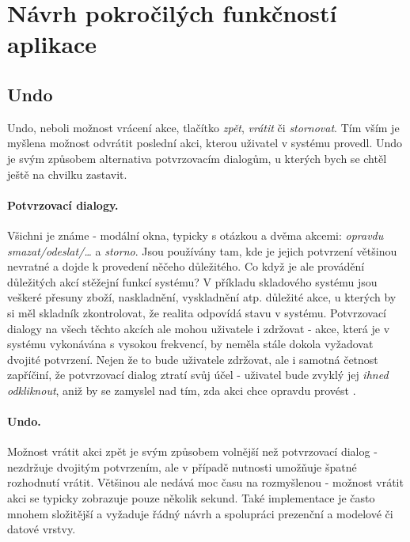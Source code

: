 \section{Návrh pokročilých funkčností aplikace}

\subsection{Undo}\label{draft:undo}

Undo, neboli možnost vrácení akce, tlačítko \emph{zpět}, \emph{vrátit} či \emph{stornovat}. Tím vším je myšlena možnost odvrátit poslední akci, kterou uživatel v systému provedl. Undo je svým způsobem alternativa potvrzovacím dialogům, u kterých bych se chtěl ještě na chvilku zastavit.

\paragraph{Potvrzovací dialogy.} Všichni je známe - modální okna, typicky s otázkou a dvěma akcemi: \emph{opravdu smazat/odeslat/\ldots} a \emph{storno}. Jsou používány tam, kde je jejich potvrzení většinou nevratné a dojde k provedení něčeho důležitého. Co když je ale provádění důležitých akcí stěžejní funkcí systému? V příkladu skladového systému jsou veškeré přesuny zboží, naskladnění, vyskladnění atp. důležité akce, u kterých by si měl skladník zkontrolovat, že realita odpovídá stavu v systému. Potvrzovací dialogy na všech těchto akcích ale mohou uživatele i zdržovat - akce, která je v systému vykonávána s vysokou frekvencí, by neměla stále dokola vyžadovat dvojité potvrzení. Nejen že to bude uživatele zdržovat, ale i samotná četnost zapříčiní, že potvrzovací dialog ztratí svůj účel - uživatel bude zvyklý jej \emph{ihned odkliknout}, aniž by se zamyslel nad tím, zda akci chce opravdu provést \cite{nn-dialogs}. 

\paragraph{Undo.} Možnost vrátit akci zpět je svým způsobem volnější než potvrzovací dialog - nezdržuje dvojitým potvrzením, ale v případě nutnosti umožňuje špatné rozhodnutí vrátit. Většinou ale nedává moc času na rozmyšlenou - možnost vrátit akci se typicky zobrazuje pouze několik sekund. Také implementace je často mnohem složitější a vyžaduje řádný návrh a spolupráci prezenční a modelové či datové vrstvy.

